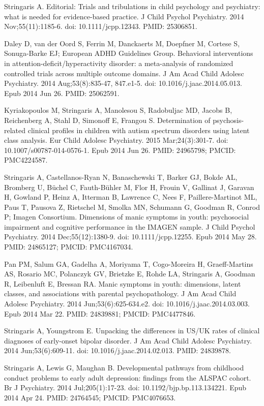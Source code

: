 \documentclass[
]{article}
\begin{document}
Stringaris A. Editorial: Trials and tribulations in child psychology and
psychiatry: what is needed for evidence-based practice. J Child Psychol
Psychiatry. 2014 Nov;55(11):1185-6. doi: 10.1111/jcpp.12343. PMID:
25306851.

Daley D, van der Oord S, Ferrin M, Danckaerts M, Doepfner M, Cortese S,
Sonuga-Barke EJ; European ADHD Guidelines Group. Behavioral
interventions in attention-deficit/hyperactivity disorder: a
meta-analysis of randomized controlled trials across multiple outcome
domains. J Am Acad Child Adolesc Psychiatry. 2014 Aug;53(8):835-47,
847.e1-5. doi: 10.1016/j.jaac.2014.05.013. Epub 2014 Jun 26. PMID:
25062591.

Kyriakopoulos M, Stringaris A, Manolesou S, Radobuljac MD, Jacobs B,
Reichenberg A, Stahl D, Simonoff E, Frangou S. Determination of
psychosis- related clinical profiles in children with autism spectrum
disorders using latent class analysis. Eur Child Adolesc Psychiatry.
2015 Mar;24(3):301-7. doi: 10.1007/s00787-014-0576-1. Epub 2014 Jun 26.
PMID: 24965798; PMCID: PMC4224587.

Stringaris A, Castellanos-Ryan N, Banaschewski T, Barker GJ, Bokde AL,
Bromberg U, Büchel C, Fauth-Bühler M, Flor H, Frouin V, Gallinat J,
Garavan H, Gowland P, Heinz A, Itterman B, Lawrence C, Nees F,
Paillere-Martinot ML, Paus T, Pausova Z, Rietschel M, Smolka MN,
Schumann G, Goodman R, Conrod P; Imagen Consortium. Dimensions of manic
symptoms in youth: psychosocial impairment and cognitive performance in
the IMAGEN sample. J Child Psychol Psychiatry. 2014 Dec;55(12):1380-9.
doi: 10.1111/jcpp.12255. Epub 2014 May 28. PMID: 24865127; PMCID:
PMC4167034.

Pan PM, Salum GA, Gadelha A, Moriyama T, Cogo-Moreira H, Graeff-Martins
AS, Rosario MC, Polanczyk GV, Brietzke E, Rohde LA, Stringaris A,
Goodman R, Leibenluft E, Bressan RA. Manic symptoms in youth:
dimensions, latent classes, and associations with parental
psychopathology. J Am Acad Child Adolesc Psychiatry. 2014
Jun;53(6):625-634.e2. doi: 10.1016/j.jaac.2014.03.003. Epub 2014 Mar 22.
PMID: 24839881; PMCID: PMC4477846.

Stringaris A, Youngstrom E. Unpacking the differences in US/UK rates of
clinical diagnoses of early-onset bipolar disorder. J Am Acad Child
Adolesc Psychiatry. 2014 Jun;53(6):609-11. doi:
10.1016/j.jaac.2014.02.013. PMID: 24839878.

Stringaris A, Lewis G, Maughan B. Developmental pathways from childhood
conduct problems to early adult depression: findings from the ALSPAC
cohort. Br J Psychiatry. 2014 Jul;205(1):17-23. doi:
10.1192/bjp.bp.113.134221. Epub 2014 Apr 24. PMID: 24764545; PMCID:
PMC4076653.
\end{document}
